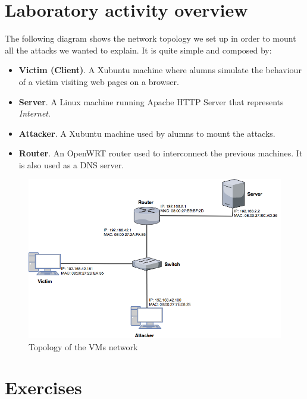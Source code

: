 \documentclass[final]{article}
\begin{document}
\section{Laboratory activity overview}
The following diagram shows the network topology we set up in order to mount all the attacks we wanted to explain. It is quite simple and composed by:
\begin{itemize}
  \item \textbf{Victim (Client)}. A Xubuntu machine where alumns simulate the behaviour of a victim visiting web pages on a browser.
  \item \textbf{Server}. A Linux machine running Apache HTTP Server that represents \textit{Internet}.
  \item \textbf{Attacker}. A Xubuntu machine used by alumns to mount the attacks.
  \item \textbf{Router}. An OpenWRT router used to interconnect the previous machines. It is also used as a DNS server.
\end{itemize}
\begin{figure}[h]
  \center
  \includegraphics[width=1\textwidth]{../figures/net_topo}
  \caption{Topology of the VMs network}
\end{figure}
\newpage
\section{Exercises}
\end{document}
